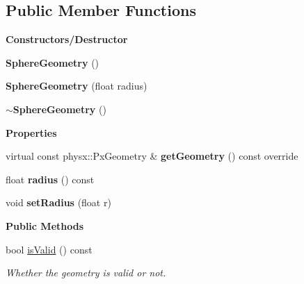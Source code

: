 \subsection*{Public Member Functions}
\begin{Indent}\textbf{ Constructors/\+Destructor}\par
\begin{DoxyCompactItemize}
\item 
\mbox{\label{classrev_1_1_sphere_geometry_a2d8439415655127fd33542c14ce685c0}} 
{\bfseries Sphere\+Geometry} ()
\item 
\mbox{\label{classrev_1_1_sphere_geometry_aae14870c1e2f6acad6bfb60c3653de76}} 
{\bfseries Sphere\+Geometry} (float radius)
\item 
\mbox{\label{classrev_1_1_sphere_geometry_acfd1ed17644b5df842201373e7973890}} 
{\bfseries $\sim$\+Sphere\+Geometry} ()
\end{DoxyCompactItemize}
\end{Indent}
\begin{Indent}\textbf{ Properties}\par
\begin{DoxyCompactItemize}
\item 
\mbox{\label{classrev_1_1_sphere_geometry_abcfd6bdced83e7194f3417092e4587df}} 
virtual const physx\+::\+Px\+Geometry \& {\bfseries get\+Geometry} () const override
\item 
\mbox{\label{classrev_1_1_sphere_geometry_a11bd845cc8d70d3e7c764a6c6e04cdce}} 
float {\bfseries radius} () const
\item 
\mbox{\label{classrev_1_1_sphere_geometry_a4a757373fd69231e7d97ff580feccbf4}} 
void {\bfseries set\+Radius} (float r)
\end{DoxyCompactItemize}
\end{Indent}
\begin{Indent}\textbf{ Public Methods}\par
\begin{DoxyCompactItemize}
\item 
\mbox{\label{classrev_1_1_sphere_geometry_a3b345a8999e79efe7cb4cf794628f7f4}} 
bool \mbox{\hyperlink{classrev_1_1_sphere_geometry_a3b345a8999e79efe7cb4cf794628f7f4}{is\+Valid}} () const
\begin{DoxyCompactList}\small\item\em Whether the geometry is valid or not. \end{DoxyCompactList}\end{DoxyCompactItemize}
\end{Indent}
